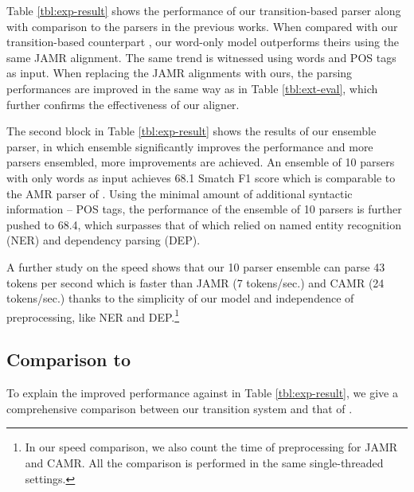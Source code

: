 \documentclass[11pt,a4paper]{article}
\begin{document}
Table \ref{tbl:exp-result} shows the performance of our transition-based parser
along with comparison to the parsers in the previous works.
When compared with our transition-based counterpart
\citep{ballesteros-alonaizan:2017:EMNLP2017}, our word-only
model outperforms theirs  using the same JAMR alignment.
The same trend is witnessed using words and POS tags as input.
When replacing the JAMR alignments with ours,
the parsing performances are improved in the same way as in Table \ref{tbl:ext-eval},
which further confirms the effectiveness of our aligner.

The second block in Table \ref{tbl:exp-result} shows the results of our ensemble parser,
in which ensemble significantly improves the performance and more parsers ensembled, more improvements are achieved.
An ensemble of 10 parsers with only words as input
achieves 68.1 Smatch F1 score which is comparable to the 
AMR parser of \citet{wang-xue:2017:EMNLP2017}.
Using the minimal amount of additional syntactic information -- POS tags,
the performance of the ensemble of 10 parsers
is further pushed to 68.4, which surpasses that of \citet{wang-xue:2017:EMNLP2017} 
which relied on named entity recognition (NER) and dependency parsing (DEP).

A further study on the speed shows that our 10 parser ensemble
can parse 43 tokens per second which
is faster than JAMR (7 tokens/sec.) and CAMR (24 tokens/sec.)
thanks to the simplicity of our model and independence of preprocessing,
like NER and DEP.\footnote{In our speed comparison, we also count the time of preprocessing for JAMR and CAMR. 
	All the comparison is performed in the same single-threaded settings.}

\subsection{Comparison to \citet{ballesteros-alonaizan:2017:EMNLP2017}}\label{sec:comp-ba17}

To explain the improved performance against \citet{ballesteros-alonaizan:2017:EMNLP2017} in Table \ref{tbl:exp-result},
we give a comprehensive comparison between
our transition system and that of \citet{ballesteros-alonaizan:2017:EMNLP2017}.
\end{document}
